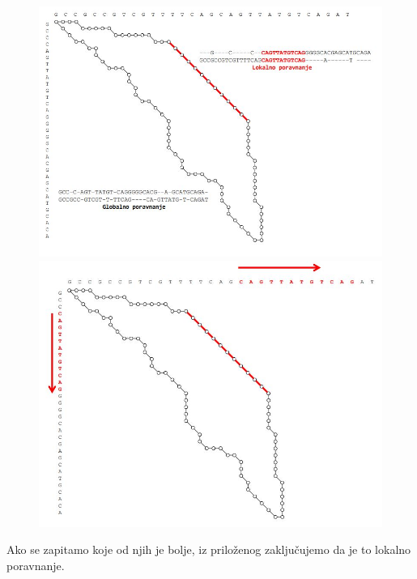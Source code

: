 \begin{figure}[!htb]
 \begin{minipage}{0.49\textwidth}
    \includegraphics[width=\linewidth]{poglavlja/5/slike/grafik_poravnanje1.JPG}
   \caption{}\label{}
 \end{minipage}
 \hfill
 \begin{minipage}{0.49\textwidth}
   \includegraphics[width=\linewidth]{poglavlja/5/slike/grafik_poravnanje2.JPG}
   \caption{}\label{}
 \end{minipage}
\end{figure}

\noindent Ako se zapitamo koje od njih je bolje, iz priloženog zaključujemo da je to lokalno poravnanje.\\

